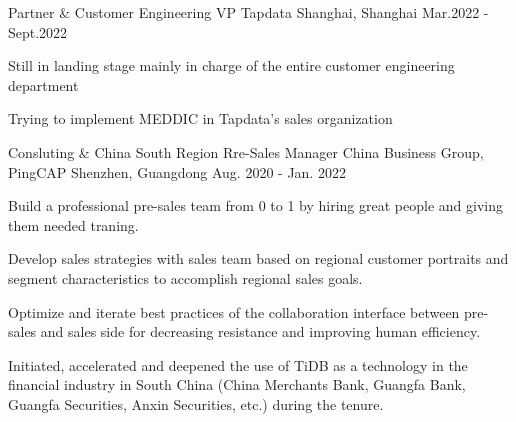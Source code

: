 

\begin{cventries}
  \cventry
    {Partner \& Customer Engineering VP} %
    {Tapdata} %
    {Shanghai, Shanghai} %
    {Mar.2022 - Sept.2022} %
    {
      \begin{cvitems} %
        \item {Still in landing stage mainly in charge of the entire customer engineering department} 
        \item {Trying to implement MEDDIC in Tapdata's sales organization}
      \end{cvitems}
    }

  \cventry
    {Consluting \& China South Region Rre-Sales Manager} %
    {China Business Group, PingCAP} %
    {Shenzhen, Guangdong} %
    {Aug. 2020 - Jan. 2022} %
    {
      \begin{cvitems} %
        \item{Build a professional pre-sales team from 0 to 1 by hiring great people and giving them needed traning.}
        \item{Develop sales strategies with sales team based on regional customer portraits and segment characteristics to accomplish regional sales goals.}
        \item{Optimize and iterate best practices of the collaboration interface between pre-sales and sales side for decreasing resistance and improving human efficiency.}
        \item{Initiated, accelerated and deepened the use of TiDB as a technology in the financial industry in South China (China Merchants Bank, Guangfa Bank, Guangfa Securities, Anxin Securities, etc.) during the tenure.}
      \end{cvitems}
    }


\end{cventries}

